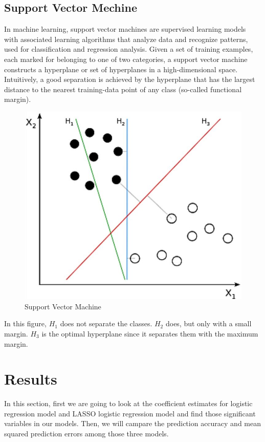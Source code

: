 \documentclass{article} %
\begin{document}
\subsection{Support Vector Mechine}
In machine learning, support vector machines are supervised learning models with associated learning algorithms that analyze data and recognize patterns, used for classification and regression analysis. Given a set of training examples, each marked for belonging to one of two categories, a support vector machine constructs a hyperplane or set of hyperplanes in a high-dimensional space. Intuitively, a good separation is achieved by the hyperplane that has the largest distance to the nearest training-data point of any class (so-called functional margin).
\begin{figure}[h]
	\begin{center}
		\includegraphics[scale = 0.5]{svm.png}
	\end{center}
	\caption{Support Vector Machine}
\end{figure}
In this figure, $H_1$ does not separate the classes. $H_2$ does, but only with a small margin. $H_3$ is the optimal hyperplane since it separates them with the maximum margin.


\section{Results}
\label{results}

In this section, first we are going to look at the coefficient estimates for logistic regression model and LASSO logistic regression model and find those significant variables in our models. Then, we will campare the prediction accuracy and mean squared prediction errors among those three models. 
\end{document}
